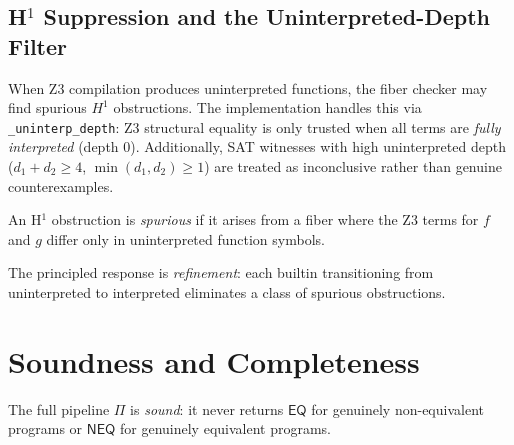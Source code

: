 \subsection{H$^1$ Suppression and the Uninterpreted-Depth Filter}

When Z3 compilation produces uninterpreted functions, the fiber
checker may find spurious $H^1$ obstructions.  The implementation
handles this via \texttt{\_uninterp\_depth}: Z3 structural
equality is only trusted when all terms are \emph{fully interpreted}
(depth 0).  Additionally, SAT witnesses with high uninterpreted
depth ($d_1 + d_2 \geq 4$, $\min(d_1, d_2) \geq 1$) are treated
as inconclusive rather than genuine counterexamples.

\begin{definition}[Spurious H$^1$]
An H$^1$ obstruction is \emph{spurious} if it arises from a fiber
where the Z3 terms for $f$ and $g$ differ only in uninterpreted
function symbols.
\end{definition}

The principled response is \emph{refinement}: each builtin
transitioning from uninterpreted to interpreted eliminates a
class of spurious obstructions.


\section{Soundness and Completeness}
\label{sec:fallback-soundness}

\begin{theorem}
\label{thm:pipeline-soundness}
The full pipeline $\Pi$ is \emph{sound}: it never returns
$\mathsf{EQ}$ for genuinely non-equivalent programs or
$\mathsf{NEQ}$ for genuinely equivalent programs.
\end{theorem}

